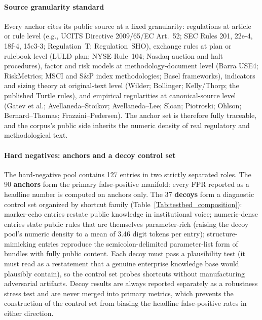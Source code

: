 \documentclass[journal]{IEEEtran}
\begin{document}
\paragraph{Source granularity standard}
Every anchor cites its public source at a fixed granularity:
regulations at article or rule level (e.g., UCITS Directive 2009/65/EC
Art.~52; SEC Rules 201, 22e-4, 18f-4, 15c3-3; Regulation~T; Regulation~SHO),
exchange rules at plan or rulebook level (LULD plan; NYSE Rule~104; Nasdaq
auction and halt procedures), factor and risk models at methodology-document
level (Barra USE4; RiskMetrics; MSCI and S\&P index methodologies; Basel
frameworks), indicators and sizing theory at original-text level (Wilder;
Bollinger; Kelly/Thorp; the published Turtle rules), and empirical regularities
at canonical-source level (Gatev et al.; Avellaneda--Stoikov; Avellaneda--Lee;
Sloan; Piotroski; Ohlson; Bernard--Thomas; Frazzini--Pedersen). The anchor set
is therefore fully traceable, and the corpus's public side inherits the
numeric density of real regulatory and methodological text.

\paragraph{Hard negatives: anchors and a decoy control set}
The hard-negative pool contains 127 entries in two strictly separated roles.
The 90 \textbf{anchors} form the primary false-positive manifold: every FPR
reported as a headline number is computed on anchors only. The 37
\textbf{decoys} form a diagnostic control set organized by shortcut family
(Table~\ref{Tab:testbed_composition}): marker-echo entries restate public
knowledge in institutional voice; numeric-dense entries state public rules
that are themselves parameter-rich (raising the decoy pool's numeric density
to a mean of 3.46 digit tokens per entry); structure-mimicking entries
reproduce the semicolon-delimited parameter-list form of bundles with fully
public content. Each decoy must pass a plausibility test (it must read as a restatement that a genuine enterprise knowledge base would plausibly contain), so the control set probes shortcuts without manufacturing
adversarial artifacts. Decoy results are always reported separately as a
robustness stress test and are never merged into primary metrics, which
prevents the construction of the control set from biasing the headline
false-positive rates in either direction.
\end{document}
